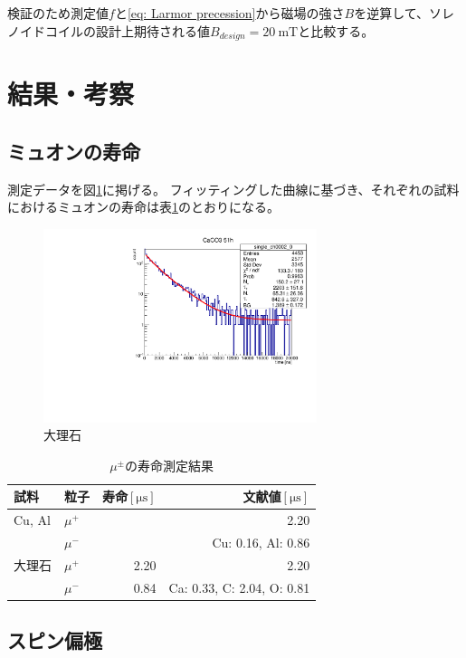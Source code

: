\documentclass[dvipdfmx]{jsarticle}
\begin{document}
検証のため測定値$f$と\eqref{eq: Larmor precession}から磁場の強さ$B$を逆算して、ソレノイドコイルの設計上期待される値$B_{design}=\SI{20}{\milli\tesla}$と比較する。


\section{結果・考察}
\subsection{ミュオンの寿命}

測定データを図\ref{fig: result: CaCO3}に掲げる。
フィッティングした曲線に基づき、それぞれの試料におけるミュオンの寿命は表\ref{table: result: life}のとおりになる。

\begin{figure}
    \centering
    \includegraphics[width=8cm]{../analysis/Life/CaCO3for51h.pdf}
    \caption{大理石}
    \label{fig: result: CaCO3}
\end{figure}

\begin{table}
    \centering
    \caption{$\mu^\pm$の寿命測定結果}
    \begin{tabular}{llrr}
        \toprule
        試料 & 粒子 & 寿命$[\unit{\micro\second}]$ & 文献値$[\unit{\micro\second}]$
        \\
        \midrule
        Cu, Al & $\mu^+$ & & 2.20
        \\
         & $\mu^-$ & & Cu: 0.16, Al: 0.86
        \\
        大理石 & $\mu^+$ & 2.20 & 2.20
        \\
         & $\mu^-$ & 0.84 & Ca: 0.33, C: 2.04, O: 0.81
        \\
        \bottomrule
    \end{tabular}
    \label{table: result: life}
\end{table}

\subsection{スピン偏極}
\end{document}
